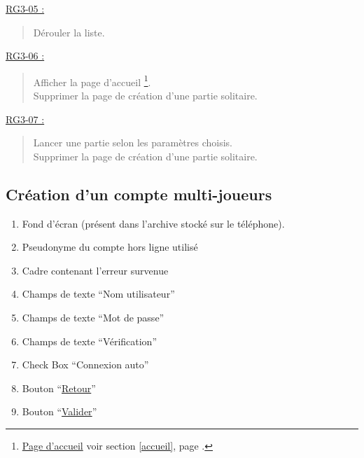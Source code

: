 \documentclass{report}
\begin{document}
			\underline{RG3-05 :}
				\begin{quote}
					Dérouler la liste.\\				
				\end{quote}	


			\underline{RG3-06 :}
				\begin{quote}
					Afficher la page d'accueil%
						\footnote[1]{
							\hyperlink{Page d'accueil}{Page d'accueil}
							\og voir section \ref{accueil}, page \pageref{accueil}.\fg
						}.\\
					Supprimer la page de création d'une partie solitaire.\\
				\end{quote}


			\underline{RG3-07 :}
				\begin{quote}
					 Lancer une partie selon les paramètres choisis.\\
					 Supprimer la page de création d'une partie solitaire.\\
				\end{quote}	


\newpage

	\subsection{Création d'un compte multi-joueurs}
	
		\hypertarget{Creation compte multi-joueurs}{}
		\label{Creation compte multi-joueurs}
	
		\begin{center}
			
		\end{center}
		
		\begin{enumerate}
		  \item Fond d'écran (présent dans l'archive stocké sur le téléphone).
		  \item Pseudonyme du compte hors ligne utilisé
		  \item Cadre contenant l'erreur survenue
		  \item Champs de texte ``Nom utilisateur''
		  \item Champs de texte ``Mot de passe''
		  \item Champs de texte ``Vérification''
		  \item Check Box ``Connexion auto''
		  \item Bouton ``\hyperlink{Connexion multi-joueurs}{Retour}''
		  \item Bouton ``\hyperlink{Accueil multi-joueurs}{Valider}''
		\end{enumerate}
		
\end{document}
